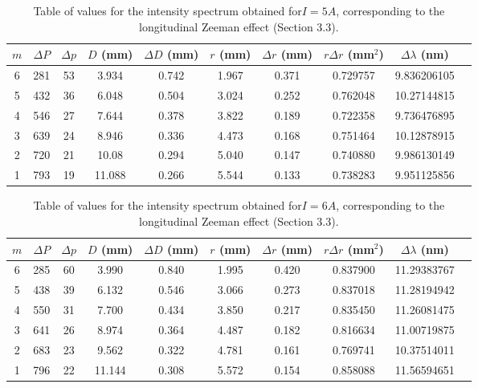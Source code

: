 \documentclass[11pt,twocolumn, a4paper]{article}
\numberwithin{equation}{section} %
\numberwithin{figure}{section} %
\numberwithin{table}{section} %
\begin{document}
\begin{table}[H]
\centering
\caption{Table of values for the intensity spectrum obtained for\(I=5A\), corresponding to the longitudinal Zeeman effect (Section 3.3).}
\begin{tabular}{c c c c c c c c c c}
\hline
$m$ & $\Delta P$ & $\Delta p$ & $D$ (mm) & $\Delta D$ (mm) & $r$ (mm) & $\Delta r$ (mm) & $r\Delta r$ (mm$^2$) & $\Delta \lambda$ (nm) \\
\hline
6 & 281 & 53 & 3.934 & 0.742 & 1.967 & 0.371 & 0.729757 & 9.836206105 \\
5 & 432 & 36 & 6.048 & 0.504 & 3.024 & 0.252 & 0.762048 & 10.27144815 \\
4 & 546 & 27 & 7.644 & 0.378 & 3.822 & 0.189 & 0.722358 & 9.736476895 \\
3 & 639 & 24 & 8.946 & 0.336 & 4.473 & 0.168 & 0.751464 & 10.12878915 \\
2 & 720 & 21 & 10.08 & 0.294 & 5.040 & 0.147 & 0.740880 & 9.986130149 \\
1 & 793 & 19 & 11.088 & 0.266 & 5.544 & 0.133 & 0.738283 & 9.951125856 \\
\hline
\end{tabular}
\end{table}
\begin{table}[H]
\centering
\caption{Table of values for the intensity spectrum obtained for\(I=6A\), corresponding to the longitudinal Zeeman effect (Section 3.3).}
\begin{tabular}{c c c c c c c c c c}
\hline
$m$ & $\Delta P$ & $\Delta p$ & $D$ (mm) & $\Delta D$ (mm) & $r$ (mm) & $\Delta r$ (mm) & $r\Delta r$ (mm$^2$) & $\Delta \lambda$ (nm) \\
\hline
6 & 285 & 60 & 3.990 & 0.840 & 1.995 & 0.420 & 0.837900 & 11.29383767 \\
5 & 438 & 39 & 6.132 & 0.546 & 3.066 & 0.273 & 0.837018 & 11.28194942 \\
4 & 550 & 31 & 7.700 & 0.434 & 3.850 & 0.217 & 0.835450 & 11.26081475 \\
3 & 641 & 26 & 8.974 & 0.364 & 4.487 & 0.182 & 0.816634 & 11.00719875 \\
2 & 683 & 23 & 9.562 & 0.322 & 4.781 & 0.161 & 0.769741 & 10.37514011 \\
1 & 796 & 22 & 11.144 & 0.308 & 5.572 & 0.154 & 0.858088 & 11.56594651 \\
\hline
\end{tabular}
\end{table}
\end{document}

